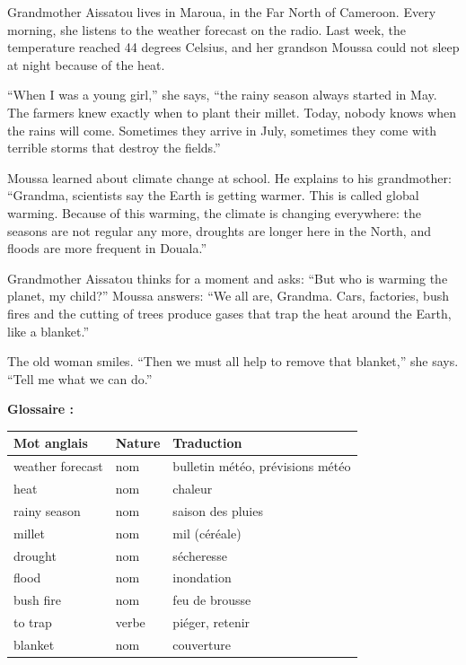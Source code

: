 \documentclass[11pt]{article}
\begin{document}
\begin{textebox}
Grandmother Aissatou lives in Maroua, in the Far North of Cameroon. Every morning, she listens to the weather forecast on the radio. Last week, the temperature reached 44 degrees Celsius, and her grandson Moussa could not sleep at night because of the heat.

“When I was a young girl,” she says, “the rainy season always started in May. The farmers knew exactly when to plant their millet. Today, nobody knows when the rains will come. Sometimes they arrive in July, sometimes they come with terrible storms that destroy the fields.”

Moussa learned about climate change at school. He explains to his grandmother: “Grandma, scientists say the Earth is getting warmer. This is called global warming. Because of this warming, the climate is changing everywhere: the seasons are not regular any more, droughts are longer here in the North, and floods are more frequent in Douala.”

Grandmother Aissatou thinks for a moment and asks: “But who is warming the planet, my child?” Moussa answers: “We all are, Grandma. Cars, factories, bush fires and the cutting of trees produce gases that trap the heat around the Earth, like a blanket.”

The old woman smiles. “Then we must all help to remove that blanket,” she says. “Tell me what we can do.”
\end{textebox}

\textbf{Glossaire :}

\begin{center}
\begin{tabularx}{\linewidth}{|X|l|X|}
\hline
\rowcolor{popblueL} Mot anglais & Nature & Traduction \\
\hline
weather forecast & nom & bulletin météo, prévisions météo \\
\hline
heat & nom & chaleur \\
\hline
rainy season & nom & saison des pluies \\
\hline
millet & nom & mil (céréale) \\
\hline
drought & nom & sécheresse \\
\hline
flood & nom & inondation \\
\hline
bush fire & nom & feu de brousse \\
\hline
to trap & verbe & piéger, retenir \\
\hline
blanket & nom & couverture \\
\hline
\end{tabularx}
\end{center}
\end{document}
